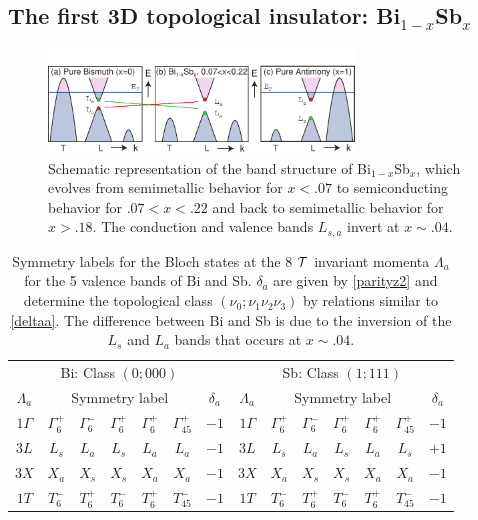 \documentclass[twocolumn,floatfix,showpacs,rmp,aps]{revtex4}
\begin{document}
\subsection{The first 3D topological insulator: Bi$_{1-x}$Sb$_x$}
\label{sec:bisb}

\begin{figure}
\includegraphics[width=3.2in]{Fig8}
\caption{Schematic representation of the band structure of Bi$_{1-x}$Sb$_x$,
which evolves from semimetallic behavior for $x<.07$ to semiconducting behavior
for $.07<x<.22$ and back to semimetallic behavior for $x>.18$.  The conduction
and valence bands $L_{s,a}$ invert at $x \sim .04$. }
\label{fig:bisbbands}
\end{figure}
\begin{table}
  \centering
\begin{ruledtabular}
\begin{tabular}{c|ccccc|c||c|ccccc|c}
\multicolumn{7}{c||}{Bi: Class $(0;000)$ } &
\multicolumn{7}{c}{Sb: Class $(1;111)$ } \\
\multicolumn{1}{c}{$\Lambda_a$} &
\multicolumn{5}{c}{Symmetry label}&
\multicolumn{1}{c||}{$\delta_a$} &
\multicolumn{1}{c}{$\Lambda_a$} &
\multicolumn{5}{c}{Symmetry label} &
\multicolumn{1}{c}{$\delta_a$} \\
\hline
$1\Gamma$ & $\Gamma_6^+$ & $\Gamma_6^-$ &$\Gamma_6^+$ &$\Gamma_6^+$ &
$\Gamma_{45}^+$ & $-1$ &
$1\Gamma$ & $\Gamma_6^+$ & $\Gamma_6^-$ &$\Gamma_6^+$ &$\Gamma_6^+$ &
$\Gamma_{45}^+$ & $-1$ \\
$3L$ & $L_s$ &$L_a$ &$L_s$ &$L_a$ &$L_a$ & $-1$ &
$3L$ & $L_s$ &$L_a$ &$L_s$ &$L_a$ &$L_s$ & $+1$ \\
$3X$ & $X_a$ & $X_s$ & $X_s$ & $X_a$ & $X_a$  & $-1$ &
$3X$ & $X_a$ & $X_s$ & $X_s$ & $X_a$ & $X_a$  & $-1$ \\
$1T$ & $T_6^-$ & $T_6^+$ & $T_6^-$ & $T_6^+$ & $T_{45}^-$ & $-1$ &
$1T$ & $T_6^-$ & $T_6^+$ & $T_6^-$ & $T_6^+$ & $T_{45}^-$ & $-1$\\
\end{tabular}
\end{ruledtabular}
\caption{Symmetry labels for the Bloch states at the 8 ${\cal T}$ invariant momenta
$\Lambda_a$ for the 5 valence bands of Bi and Sb.
$\delta_a$ are given by \eqref{parityz2} and
determine the topological class $(\nu_0;\nu_1\nu_2\nu_3)$ by
relations similar to \eqref{deltaa}.
The difference between Bi and Sb is due to the inversion of
the $L_s$ and $L_a$ bands that occurs at $x \sim .04$.}
\label{tab:bisbtab}
\end{table}
\end{document}
